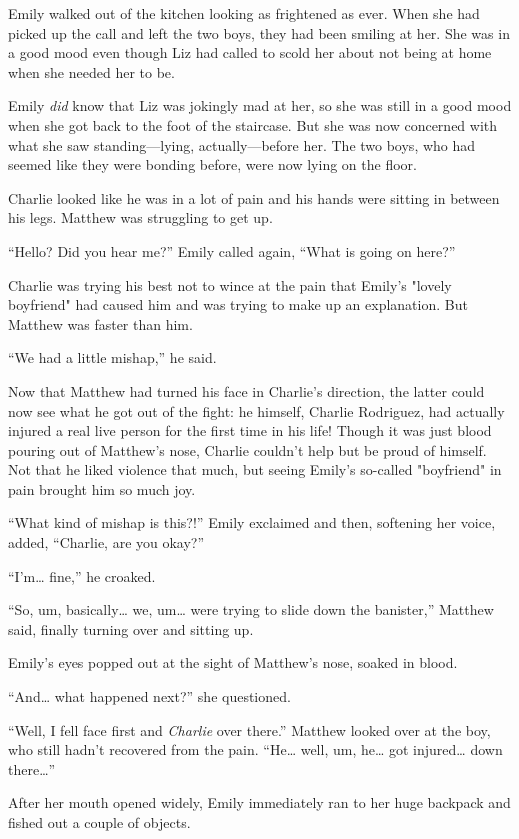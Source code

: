 Emily walked out of the kitchen looking as frightened as ever. When she had picked up the call and left the two boys, they had been smiling at her. She was in a good mood even though Liz had called to scold her about not being at home when she needed her to be.

Emily \textit{did} know that Liz was jokingly mad at her, so she was still in a good mood when she got back to the foot of the staircase. But she was now concerned with what she saw standing—lying, actually—before her. The two boys, who had seemed like they were bonding before, were now lying on the floor.

Charlie looked like he was in a lot of pain and his hands were sitting in between his legs. Matthew was struggling to get up.

“Hello? Did you hear me?” Emily called again, “What is going on here?”

Charlie was trying his best not to wince at the pain that Emily's "lovely boyfriend" had caused him and was trying to make up an explanation. But Matthew was faster than him.

“We had a little mishap,” he said.

Now that Matthew had turned his face in Charlie's direction, the latter could now see what he got out of the fight: he himself, Charlie Rodriguez, had actually injured a real live person for the first time in his life! Though it was just blood pouring out of Matthew's nose, Charlie couldn't help but be proud of himself. Not that he liked violence that much, but seeing Emily's so-called "boyfriend" in pain brought him so much joy.

“What kind of mishap is this?!” Emily exclaimed and then, softening her voice, added, “Charlie, are you okay?”

“I'm… fine,” he croaked.

“So, um, basically… we, um… were trying to slide down the banister,” Matthew said, finally turning over and sitting up.

Emily's eyes popped out at the sight of Matthew's nose, soaked in blood.

“And… what happened next?” she questioned.

“Well, I fell face first and \textit{Charlie} over there.” Matthew looked over at the boy, who still hadn't recovered from the pain. “He… well, um, he… got injured… down there…”

After her mouth opened widely, Emily immediately ran to her huge backpack and fished out a couple of objects.

